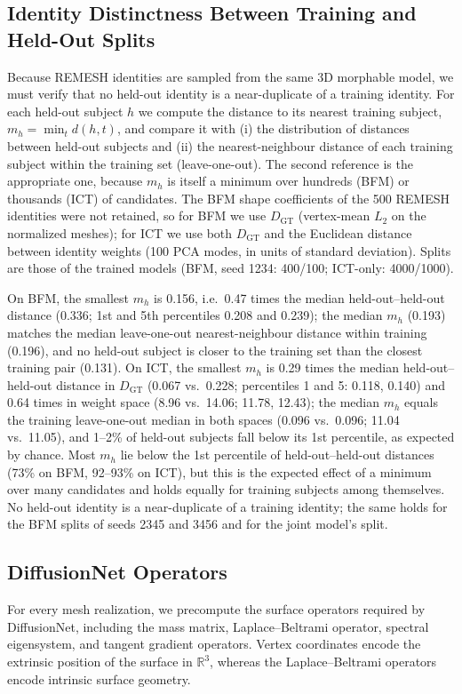 \documentclass[10pt,twocolumn,letterpaper]{article}
\begin{document}
\subsection{Identity Distinctness Between Training and Held-Out Splits}
\label{app:identity_distinctness}
Because REMESH identities are sampled from the same 3D morphable model, we
must verify that no held-out identity is a near-duplicate of a training
identity. For each held-out subject $h$ we compute the distance to its nearest
training subject, $m_h=\min_t d(h,t)$, and compare it with (i) the distribution
of distances between held-out subjects and (ii) the nearest-neighbour distance
of each training subject within the training set (leave-one-out). The second
reference is the appropriate one, because $m_h$ is itself a minimum over
hundreds (BFM) or thousands (ICT) of candidates. The BFM shape coefficients of
the 500 REMESH identities were not retained, so for BFM we use $D_{\mathrm{GT}}$
(vertex-mean $L_2$ on the normalized meshes); for ICT we use both
$D_{\mathrm{GT}}$ and the Euclidean distance between identity weights (100 PCA
modes, in units of standard deviation). Splits are those of the trained models
(BFM, seed 1234: 400/100; ICT-only: 4000/1000).

On BFM, the smallest $m_h$ is 0.156, i.e.\ 0.47 times the median
held-out--held-out distance (0.336; 1st and 5th percentiles 0.208 and 0.239);
the median $m_h$ (0.193) matches the median leave-one-out nearest-neighbour
distance within training (0.196), and no held-out subject is closer to the
training set than the closest training pair (0.131). On ICT, the smallest $m_h$
is 0.29 times the median held-out--held-out distance in $D_{\mathrm{GT}}$ (0.067
vs.\ 0.228; percentiles 1 and 5: 0.118, 0.140) and 0.64 times in weight space
(8.96 vs.\ 14.06; 11.78, 12.43); the median $m_h$ equals the training
leave-one-out median in both spaces (0.096 vs.\ 0.096; 11.04 vs.\ 11.05), and
1--2\% of held-out subjects fall below its 1st percentile, as expected by
chance. Most $m_h$ lie below the 1st percentile of held-out--held-out distances
(73\% on BFM, 92--93\% on ICT), but this is the expected effect of a minimum over
many candidates and holds equally for training subjects among themselves. No
held-out identity is a near-duplicate of a training identity; the same holds
for the BFM splits of seeds 2345 and 3456 and for the joint model's split.

\subsection{DiffusionNet Operators}
\label{app:diffusionnet_operators}
For every mesh realization, we precompute the surface operators required by DiffusionNet, including the mass matrix, Laplace--Beltrami operator, spectral eigensystem, and tangent gradient operators. Vertex coordinates encode the extrinsic position of the surface in $\mathbb{R}^3$, whereas the Laplace--Beltrami operators encode intrinsic surface geometry.
\end{document}

